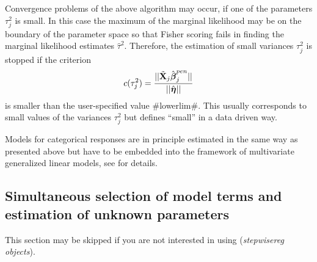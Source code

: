 \documentclass[11pt,a4paper,twoside]{bayesxarticle}
\begin{document}
Convergence problems of the above algorithm may occur, if one of the
parameters $\tau_j^2$ is small. In this case the maximum of the
marginal likelihood may be on the boundary of the parameter space so
that Fisher scoring fails in finding the marginal likelihood
estimates $\hat{\tau}^2$. Therefore, the estimation of small
variances $\tau_j^2$ is stopped if the criterion
\begin{equation}\label{remlstopcrit}
 c(\tau_j^2)=\frac{||\tilde{\Xvec}_j\hat{\betavec}_j^{pen}||}{||\hat{\etavec}||}
\end{equation}
is smaller than the user-specified value #lowerlim#. This usually corresponds to small values of the variances $\tau_j^2$ but
defines ``small'' in a data driven way.

Models for categorical responses are in principle estimated in the same way as presented above but have to be embedded into the
framework of multivariate generalized linear models, see  for details.

\subsection{Simultaneous selection of model terms and estimation of unknown parameters}
\label{stepwiseest}
 

This section may be skipped if you are not interested in using ({\em stepwisereg objects}).
\end{document}
